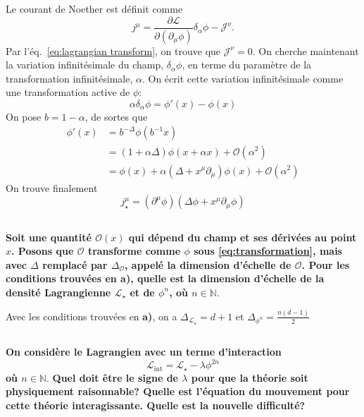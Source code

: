 \documentclass{article}
\numberwithin{equation}{section}
\theoremstyle{solution}
\begin{document}
Le courant de Noether est définit comme
\begin{equation}
        j^{\mu} = \frac{\partial \mathcal{L}}{\partial (\partial_{\mu}\phi)} \delta_\alpha  \phi  - \mathcal{J}^{\nu}.
\end{equation} 
Par l'éq.~\eqref{eq:lagrangian transform}, on trouve que $\mathcal{J}^{\nu} = 0$. On cherche maintenant la variation infinitésimale 
du champ, $\delta_{\alpha} \phi$, en terme du paramètre de la transformation infinitésimale, $\alpha$. On écrit cette variation 
infinitésimale comme une transformation active de $\phi$:
\begin{equation}
       \alpha\delta_\alpha \phi = \phi'(x) - \phi(x) 
\end{equation} 
On pose $b = 1 - \alpha$, de sortes que
\begin{align*}
        \phi'(x) &= b^{-\Delta}\phi(b^{-1}x) \\
              &= (1 + \alpha\Delta) \phi(x + \alpha x) + \mathcal{O}(\alpha^{2}) \\
              &= \phi(x) + \alpha(\Delta + x^{\mu}\partial_{\mu})\phi(x) + \mathcal{O}(\alpha^{2})
\end{align*}
On trouve finalement
\begin{equation}\label{eq:Noether current}
        \boxed{j^{\mu}_\star = (\partial^{\mu} \phi)(\Delta \phi + x^{\mu}\partial_{\mu} \phi)}
\end{equation} 

\subsection{}
\textbf{Soit une quantité $\mathcal{O}(x)$ qui dépend du champ et ses dérivées au point $x$. Posons que $\mathcal{O}$ 
transforme comme $\phi$ sous \eqref{eq:transformation}, mais avec $\Delta$ remplacé par $\Delta_\mathcal{O}$, appelé la dimension d’échelle
de $\mathcal{O}$. Pour les conditions trouvées en a), quelle est la dimension d’échelle de la densité
Lagrangienne $\mathcal{L}_{\star}$ et de $\phi^{n}$, où $n \in \mathbb{N}$}.
\vspace{2ex}

Avec les conditions trouvées en \textbf{a)}, on a $\boxed{\Delta_{\mathcal{L}_\star} = d+1}$ et $\boxed{\Delta_{\phi^{n}} = \frac{n(d-1)}{2}}$

\subsection{}
\textbf{On considère le Lagrangien avec un terme d'interaction}
\begin{equation}\label{eq:Lagrangien2c}
       \mathcal{L}_{\mathrm{int}} = \mathcal{L}_{\star} - \lambda \phi^{2n} 
\end{equation} 
\textbf{où $n \in \mathbb{N}$}.
\textbf{Quel doit être le signe de $\lambda$ pour que la théorie soit physiquement 
raisonnable? Quelle est l’équation du mouvement pour cette théorie interagissante. Quelle est la nouvelle difficulté?}
\end{document}
